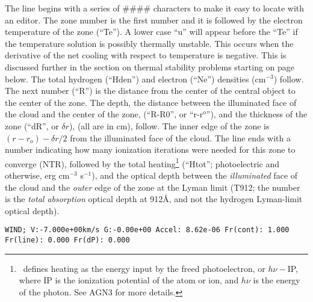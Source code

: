 The line begins with a series of \#\#\#\# characters to make it easy
to locate with an editor.
The zone number is the first number and it is
followed by the electron temperature of the zone (``Te'').
A lower case
``u'' will appear before the ``Te'' if the temperature solution is possibly
thermally unstable.
This occurs when the derivative of the net cooling
with respect to temperature is negative.
This is discussed further in the
section on thermal stability problems starting on page
\pageref{sec:ThermalStabilityProblems} below.
The total hydrogen (``Hden'')
and electron (``Ne'') densities (cm$^{-3}$) follow.
The next number (``R'')
is the distance from the center of the central object to the center of the
zone.
The depth, the distance between the illuminated face of the cloud
and the center of the zone, (``R-R0'', or ``r-r$^{\mathrm{o}}$''),
and the thickness of
the zone (``dR'', or $\delta r$), (all are in cm), follow.
The inner edge of the
zone is $( {r - {r_o}} ) - \delta r/2$
from the illuminated face of the cloud.
The line ends with a number
indicating how many ionization iterations were needed for this zone to
converge (NTR), followed by the total heating\footnote{\Cloudy\ defines heating as the energy input by the freed photoelectron,
or $h\nu - $IP, where IP is the ionization potential of the atom or ion, and
$h\nu$ is the energy of the photon.  See AGN3 for more details.} (``Htot''; photoelectric
and otherwise, erg cm$^{-3}$ s$^{-1}$),
and the optical depth between the
\emph{illuminated}
face of the cloud and the \emph{outer} edge of the zone at the Lyman limit (T912;
the number is the \emph{total absorption} optical depth at 912\AA,
and not the
hydrogen Lyman-limit optical depth).
{\setverbatimfontsize{\tiny}
\begin{verbatim}
WIND; V:-7.000e+00km/s G:-0.00e+00 Accel: 8.62e-06 Fr(cont): 1.000 Fr(line): 0.000 Fr(dP): 0.000
\end{verbatim}
}

